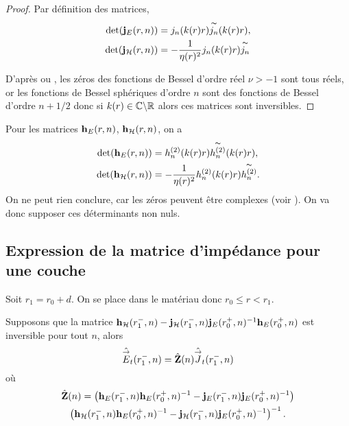     \begin{proof}
      Par définition des matrices,
      \begin{align*}
        \det(\mathbf{j}_E(r,n)) &= j_n(k(r)r)\overset{\thicksim}{j_n}(k(r)r),
        \\
        \det(\mathbf{j}_{\mathcal{H}}(r,n)) &= -\dfrac{1}{\eta(r)^2}j_n(k(r)r)\overset{\thicksim}{j_n}
      \end{align*}

      D’après \cite[p.~370]{abramowitz_handbook_1964} ou \cite[\url{https://dlmf.nist.gov/10.58}]{dlmf_nist_2019}, les zéros des fonctions de Bessel d'ordre réel \(\nu >-1\) sont tous réels, or les fonctions de Bessel sphériques d'ordre \(n\) sont des fonctions de Bessel d'ordre \(n+1/2\) donc si \(k(r) \in\mathbb C\backslash\mathbb R\) alors ces matrices sont inversibles.
    \end{proof}


    Pour les matrices \(\mathbf{h}_E(r,n)\), \(\mathbf{h}_{\mathcal{H}}(r,n)\), on a
    \begin{align*}
        \det(\mathbf{h}_E(r,n)) &= h^{(2)}_n(k(r)r)\overset{\thicksim}{h^{(2)}_n}(k(r)r),
        \\
        \det(\mathbf{h}_{\mathcal{H}}(r,n)) &= -\dfrac{1}{\eta(r)^2}h^{(2)}_n(k(r)r)\overset{\thicksim}{h^{(2)}_n}.
     \end{align*}
    On ne peut rien conclure, car les zéros peuvent être complexes (voir \cite{sandstrom_note_2007}). On va donc supposer ces déterminants non nuls.




  \subsection{Expression de la matrice d'impédance pour une couche}

    Soit \(r_1 = r_0 + d\). On se place dans le matériau donc \(r_0 \le r < r_1\).

    \begin{prop}
     Supposons que la matrice \(\mathbf{h}_{\mathcal{H}}(r_1^-,n) - \mathbf{j}_{\mathcal{H}}(r_1^-,n)\mathbf{j}_{E}(r_0^+,n)^{-1}\mathbf{h}_{E}(r_0^+,n)\) est inversible pour tout \(n\), alors
      \begin{equation*}
        \hat {{\overset{\rightarrow}{E}}}_t(r_1^-,n) = \hat {\mathbf{Z}}(n) \hat {{\overset{\rightarrow}{J}}}_t(r_1^-,n)
      \end{equation*}
      où
      \begin{multline*}
        \hat {\mathbf{Z}}(n) =
        \left(\mathbf{h}_{E}(r_1^-,n)\mathbf{h}_{E}(r_0^+,n)^{-1} - \mathbf{j}_{E}(r_1^-,n)\mathbf{j}_{E}(r_0^+,n)^{-1}\right)\\
        \left(\mathbf{h}_{\mathcal{H}}(r_1^-,n)\mathbf{h}_{E}(r_0^+,n)^{-1} - \mathbf{j}_{\mathcal{H}}(r_1^-,n)\mathbf{j}_{E}(r_0^+,n)^{-1}\right)^{-1}.
      \end{multline*}
    \end{prop}

